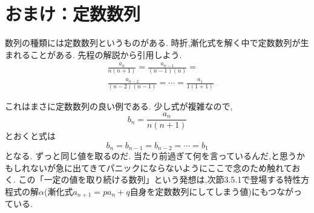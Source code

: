 
\section{おまけ：定数数列}
  数列の種類には定数数列というものがある.
  時折,漸化式を解く中で定数数列が生まれることがある.
  先程の解説から引用しよう.
  \begin{align*}
    &\frac{a_{n}}{n(n+1)}=\frac{a_{n-1}}{(n-1)(n)}=\\
    &\frac{a_{n-2}}{(n-2)(n-1)}=\cdots=\frac{a_{1}}{1(1+1)}
  \end{align*}

  これはまさに定数数列の良い例である.
  少し式が複雑なので,
  \[
    b_n=\frac{a_{n}}{n(n+1)}
  \]
  とおくと式は
  \[
    b_n=b_{n-1}=b_{n-2}=\cdots=b_1
  \]
  となる.
  ずっと同じ値を取るのだ.
  当たり前過ぎて何を言っているんだ,と思うかもしれないが急に出てきてパニックにならないようにここで念のため触れておく.
  この「一定の値を取り続ける数列」という発想は,次節3.5.1で登場する特性方程式の解$\alpha$(漸化式$a_{n+1}=pa_n+q$自身を定数数列にしてしまう値)にもつながっている.

